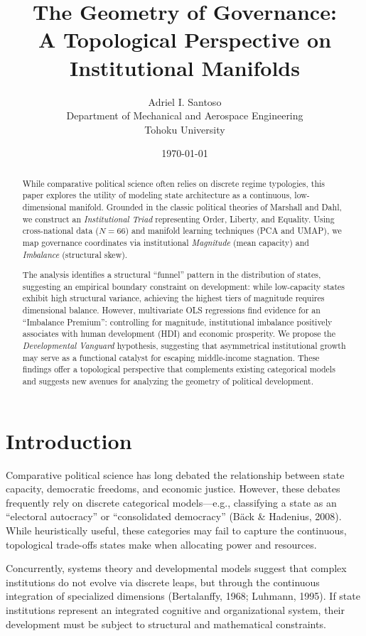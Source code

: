 \documentclass[12pt]{article}
\title{The Geometry of Governance: \\ A Topological Perspective on Institutional Manifolds}
\author{
Adriel I. Santoso \\
Department of Mechanical and Aerospace Engineering \\
Tohoku University
}
\date{\today}
\begin{document}
\maketitle

\begin{abstract}
While comparative political science often relies on discrete regime typologies, this paper explores the utility of modeling state architecture as a continuous, low-dimensional manifold. Grounded in the classic political theories of Marshall and Dahl, we construct an \textit{Institutional Triad} representing Order, Liberty, and Equality. Using cross-national data ($N=66$) and manifold learning techniques (PCA and UMAP), we map governance coordinates via institutional \textit{Magnitude} (mean capacity) and \textit{Imbalance} (structural skew). 

The analysis identifies a structural ``funnel'' pattern in the distribution of states, suggesting an empirical boundary constraint on development: while low-capacity states exhibit high structural variance, achieving the highest tiers of magnitude requires dimensional balance. However, multivariate OLS regressions find evidence for an ``Imbalance Premium'': controlling for magnitude, institutional imbalance positively associates with human development (HDI) and economic prosperity. We propose the \textit{Developmental Vanguard} hypothesis, suggesting that asymmetrical institutional growth may serve as a functional catalyst for escaping middle-income stagnation. These findings offer a topological perspective that complements existing categorical models and suggests new avenues for analyzing the geometry of political development.
\end{abstract}

\section{Introduction}

Comparative political science has long debated the relationship between state capacity, democratic freedoms, and economic justice. However, these debates frequently rely on discrete categorical models—e.g., classifying a state as an ``electoral autocracy'' or ``consolidated democracy'' (Bäck \& Hadenius, 2008). While heuristically useful, these categories may fail to capture the continuous, topological trade-offs states make when allocating power and resources.

Concurrently, systems theory and developmental models suggest that complex institutions do not evolve via discrete leaps, but through the continuous integration of specialized dimensions (Bertalanffy, 1968; Luhmann, 1995). If state institutions represent an integrated cognitive and organizational system, their development must be subject to structural and mathematical constraints.
\end{document}
